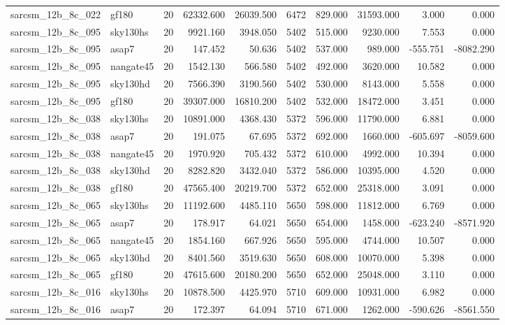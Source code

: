 \begin{longtable}{llrrrrrrrr}
sarcsm\_12b\_8c\_022 & gf180 & 20 & 62332.600 & 26039.500 & 6472 & 829.000 & 31593.000 & 3.000 & 0.000 \\
sarcsm\_12b\_8c\_095 & sky130hs & 20 & 9921.160 & 3948.050 & 5402 & 515.000 & 9230.000 & 7.553 & 0.000 \\
sarcsm\_12b\_8c\_095 & asap7 & 20 & 147.452 & 50.636 & 5402 & 537.000 & 989.000 & -555.751 & -8082.290 \\
sarcsm\_12b\_8c\_095 & nangate45 & 20 & 1542.130 & 566.580 & 5402 & 492.000 & 3620.000 & 10.582 & 0.000 \\
sarcsm\_12b\_8c\_095 & sky130hd & 20 & 7566.390 & 3190.560 & 5402 & 530.000 & 8143.000 & 5.558 & 0.000 \\
sarcsm\_12b\_8c\_095 & gf180 & 20 & 39307.000 & 16810.200 & 5402 & 532.000 & 18472.000 & 3.451 & 0.000 \\
sarcsm\_12b\_8c\_038 & sky130hs & 20 & 10891.000 & 4368.430 & 5372 & 596.000 & 11790.000 & 6.881 & 0.000 \\
sarcsm\_12b\_8c\_038 & asap7 & 20 & 191.075 & 67.695 & 5372 & 692.000 & 1660.000 & -605.697 & -8059.600 \\
sarcsm\_12b\_8c\_038 & nangate45 & 20 & 1970.920 & 705.432 & 5372 & 610.000 & 4992.000 & 10.394 & 0.000 \\
sarcsm\_12b\_8c\_038 & sky130hd & 20 & 8282.820 & 3432.040 & 5372 & 586.000 & 10395.000 & 4.520 & 0.000 \\
sarcsm\_12b\_8c\_038 & gf180 & 20 & 47565.400 & 20219.700 & 5372 & 652.000 & 25318.000 & 3.091 & 0.000 \\
sarcsm\_12b\_8c\_065 & sky130hs & 20 & 11192.600 & 4485.110 & 5650 & 598.000 & 11812.000 & 6.769 & 0.000 \\
sarcsm\_12b\_8c\_065 & asap7 & 20 & 178.917 & 64.021 & 5650 & 654.000 & 1458.000 & -623.240 & -8571.920 \\
sarcsm\_12b\_8c\_065 & nangate45 & 20 & 1854.160 & 667.926 & 5650 & 595.000 & 4744.000 & 10.507 & 0.000 \\
sarcsm\_12b\_8c\_065 & sky130hd & 20 & 8401.560 & 3519.630 & 5650 & 608.000 & 10070.000 & 5.398 & 0.000 \\
sarcsm\_12b\_8c\_065 & gf180 & 20 & 47615.600 & 20180.200 & 5650 & 652.000 & 25048.000 & 3.110 & 0.000 \\
sarcsm\_12b\_8c\_016 & sky130hs & 20 & 10878.500 & 4425.970 & 5710 & 609.000 & 10931.000 & 6.982 & 0.000 \\
sarcsm\_12b\_8c\_016 & asap7 & 20 & 172.397 & 64.094 & 5710 & 671.000 & 1262.000 & -590.626 & -8561.550 \\

\end{longtable}

